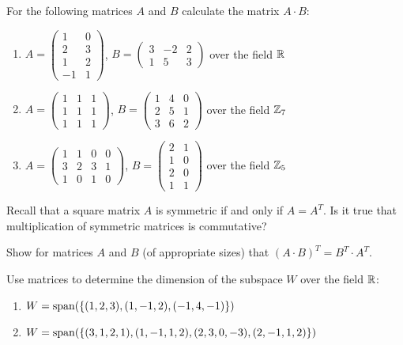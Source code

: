 \begin{exercise}
For the following matrices $A$ and $B$ calculate the matrix $A\cdot B$:
\begin{enumerate}[label=(\alph*)]
\item $A = \left( \begin{array}{cc} 1 & 0\\ 2 & 3\\ 1 & 2\\ -1 & 1 \end{array} \right)$, \quad
$B = \left( \begin{array}{ccc} 3 & -2 & 2\\ 1 & 5 & 3 \end{array} \right)$ \quad over the field $\mathbb{R}$
\item $A = \left( \begin{array}{ccc} 1 & 1 & 1\\ 1 & 1 & 1\\ 1 & 1 & 1 \end{array} \right)$, \quad
$B = \left( \begin{array}{ccc} 1 & 4 & 0\\ 2 & 5 & 1\\ 3 & 6 & 2 \end{array} \right)$ \quad over the
field $\mathbb{Z}_7$
\item $A = \left( \begin{array}{cccc} 1 & 1 & 0 & 0\\ 3 & 2 & 3 & 1\\ 1 & 0 & 1 & 0 \end{array} \right)$,
\quad $B = \left( \begin{array}{cc} 2 & 1\\ 1 & 0\\ 2 & 0\\ 1 & 1 \end{array} \right)$ \quad over the
field $\mathbb{Z}_5$
\end{enumerate}
\end{exercise}

\begin{exercise}
Recall that a square matrix $A$ is symmetric if and only if $A = A^T$. Is it true that multiplication of
symmetric matrices is commutative?
\end{exercise}

\begin{exercise}
Show for matrices $A$ and $B$ (of appropriate sizes) that $(A\cdot B)^T = B^T\cdot A^T$.
\end{exercise}

\begin{exercise}
Use matrices to determine the dimension of the subspace $W$ over the field $\mathbb{R}$:
\begin{enumerate}[label=(\alph*)]
\item $W = \operatorname{span}\!\left(\{(1,2,3),(1,-1,2),(-1,4,-1)\}\right)$
\item $W = \operatorname{span}\!\left(\{(3,1,2,1),(1,-1,1,2),(2,3,0,-3),(2,-1,1,2)\}\right)$
\end{enumerate}
\end{exercise}
